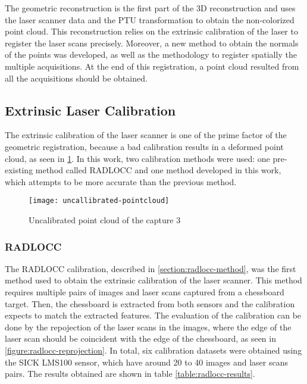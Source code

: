 The geometric reconstruction is the first part of the 3D reconstruction and uses the laser scanner data and the PTU transformation to obtain the non-colorized point cloud. This reconstruction relies on the extrinsic calibration of the laser to register the laser scans precisely. Moreover, a new method to obtain the normals of the points was developed, as well as the methodology to register spatially the multiple acquisitions. At the end of this registration, a point cloud resulted from all the acquisitions should be obtained.

\subsection{Extrinsic Laser Calibration}

The extrinsic calibration of the laser scanner is one of the prime factor of the geometric registration, because a bad calibration results in a deformed point cloud, as seen in \cref{figure:uncallibrated-pointcloud}. In this work, two calibration methods were used: one pre-existing method called RADLOCC and one method developed in this work, which attempts to be more accurate than the previous method. 

\begin{figure}[h]
    
    \centering
    \texttt{[image: uncallibrated-pointcloud]}

    \caption{Uncalibrated point cloud of the capture 3}
    \label{figure:uncallibrated-pointcloud}

\end{figure}

\subsubsection{RADLOCC}

The RADLOCC calibration, described in \cref{section:radlocc-method}, was the first method used to obtain the extrinsic calibration of the laser scanner. This method requires multiple pairs of images and laser scans captured from a chessboard target. Then, the chessboard is extracted from both sensors and the calibration expects to match the extracted features. The evaluation of the calibration can be done by the repojection of the laser scans in the images, where the edge of the laser scan should be coincident with the edge of the chessboard, as seen in \cref{figure:radlocc-reprojection}. In total, six calibration datasets were obtained using the SICK LMS100 sensor, which have around 20 to 40 images and laser scans pairs. The results obtained are shown in table \cref{table:radlocc-results}.

